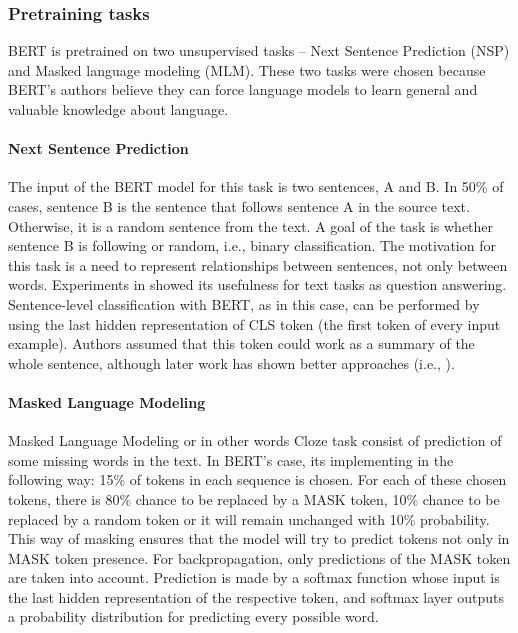 \subsubsection{Pretraining tasks}
BERT is pretrained on two unsupervised tasks -- Next Sentence Prediction (NSP) and Masked language modeling (MLM). These two tasks were chosen because BERT's authors believe they can force language models to learn general and valuable knowledge about language.
\paragraph{Next Sentence Prediction}
The input of the BERT model for this task is two sentences, A and B. In 50\% of cases, sentence B is the sentence that follows sentence A in the source text. Otherwise, it is a random sentence from the text. A goal of the task is whether sentence B is following or random, i.e., binary classification. The motivation for this task is a need to represent relationships between sentences, not only between words. Experiments in \citep{
Devlin2019} showed its usefulness for text tasks as question answering. Sentence-level classification with BERT, as in this case, can be performed by using the last hidden representation of CLS token (the first token of every input example). Authors assumed that this token could work as a summary of the whole sentence, although later work has shown better approaches (i.e., \citep{Liu2019}). 
\paragraph{Masked Language Modeling}
Masked Language Modeling or in other words Cloze task \citep{Taylor1953}
consist of prediction of some missing words in the text. In BERT's case, its implementing in the following way: 15\% of tokens in each sequence is chosen. For each of these chosen tokens, there is 80\% chance to be replaced by a MASK token, 10\% chance to be replaced by a random token or it will remain unchanged with 10\% probability. This way of masking ensures that the model will try to predict tokens not only in MASK token presence. For backpropagation, only predictions of the MASK token are taken into account. Prediction is made by a softmax function whose input is the last hidden representation of the respective token, and softmax layer outputs a probability distribution for predicting every possible word. 

